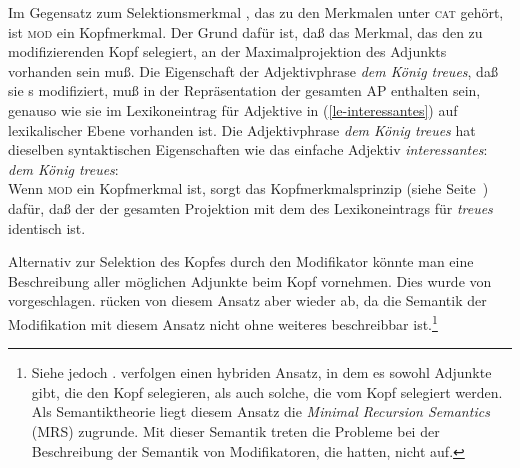 Im Gegensatz zum Selektionsmerkmal \subcat, das zu den Merkmalen unter \textsc{cat}  gehört,
ist \textsc{mod} ein Kopfmerkmal.
Der Grund dafür ist, daß das Merkmal, das den zu modifizierenden Kopf selegiert, an der
Maximalprojektion des Adjunkts vorhanden sein muß. Die Eigenschaft der Adjektivphrase \emph{dem
König treues}, daß sie \nbar{}s modifiziert, muß in der Repräsentation der gesamten AP enthalten sein,
genauso wie sie im Lexikoneintrag für Adjektive in (\ref{le-interessantes}) auf lexikalischer Ebene
vorhanden ist. Die Adjektivphrase \emph{dem König treues} hat dieselben syntaktischen Eigenschaften wie das einfache
Adjektiv \emph{interessantes}:
\ea
\label{avm-dem-koenig-treues}
\emph{dem König treues}:\\
\z
Wenn \textsc{mod} ein Kopfmerkmal ist, sorgt das Kopfmerkmalsprinzip (siehe Seite~\pageref{prinzip-hfp})
dafür, daß der \modw der gesamten Projektion mit dem \modw des Lexikoneintrags für \emph{treues} identisch ist.


Alternativ zur Selektion des Kopfes durch den Modifikator könnte man eine
Beschreibung aller möglichen Adjunkte beim Kopf vornehmen. Dies wurde von
\citet[]{ps} vorgeschlagen. \citet[Abschnitt~1.9]{ps2} rücken von diesem Ansatz aber wieder
ab, da die Semantik der Modifikation mit diesem Ansatz nicht ohne weiteres
beschreibbar ist.\footnote{
        Siehe jedoch . \citet*{BMS2001a} verfolgen einen hybriden Ansatz, in dem es sowohl Adjunkte gibt,
        die den Kopf selegieren, als auch solche, die vom Kopf selegiert werden.
        Als Semantiktheorie liegt diesem Ansatz die \textit{Minimal Recursion Semantics}
        (MRS)
        zugrunde. Mit dieser Semantik treten die Probleme bei der Beschreibung der Semantik
        von Modifikatoren, die \citet*{ps} hatten, nicht auf.
}


